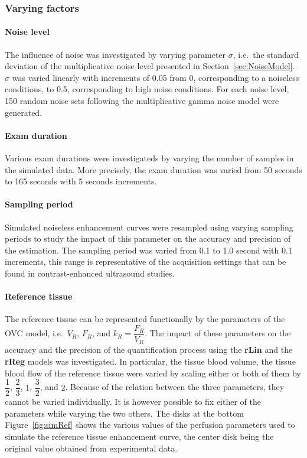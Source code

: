 \subsubsection{Varying factors}
\paragraph{Noise level}
The influence of noise was investigated by varying parameter $\sigma$, i.e.~the standard deviation of the multiplicative noise level presented in Section~\ref{sec:NoiseModel}.
$\sigma$ was varied linearly with increments of 0.05 from 0, corresponding to a noiseless conditions, to 0.5, corresponding to high noise conditions.
For each noise level, 150 random noise sets following the multiplicative gamma noise model were generated.

\paragraph{Exam duration}
Various exam durations were investigateds by varying the number of samples in the simulated data.
More precisely, the exam duration was varied from 50 seconds to 165 seconds with 5 seconds increments.

\paragraph{Sampling period}
Simulated noiseless enhancement curves were resampled using varying sampling periods to study the impact of this parameter on the accuracy and precision of the estimation.
The sampling period was varied from 0.1 to 1.0 second with 0.1 increments, this range is representative of the acquisition settings that can be found in contrast-enhanced ultrasound studies.

\paragraph{Reference tissue}
The reference tissue can be represented functionally by the parameters of the OVC model, i.e.~$V_R$, $F_R$, and $k_R = \dfrac{F_R}{V_R}$.
The impact of these parameters on the accuracy and the precision of the quantification process using the \textbf{rLin} and the \textbf{rReg} models was investigated.
In particular, the tissue blood volume, the tissue blood flow of the reference tissue were varied by scaling either or both of them by $\dfrac{1}{2}$, $\dfrac{2}{3}$, $1$, $\dfrac{3}{2}$, and $2$.
Because of the relation between the three parameters, they cannot be varied individually.
It is however possible to fix either of the parameters while varying the two others.
The disks at the bottom Figure~\ref{fig:simRef} shows the various values of the perfusion parameters used to simulate the reference tissue enhancement curve, the center disk being the original value obtained from experimental data.


